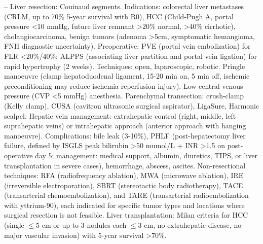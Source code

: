 -- Liver resection: Couinaud segments. Indications: colorectal liver metastases (CRLM, up to 70\% 5-year survival with R0), HCC (Child-Pugh A, portal pressure <10 mmHg, future liver remnant >20\% normal, >40\% cirrhotic), cholangiocarcinoma, benign tumors (adenoma >5cm, symptomatic hemangioma, FNH diagnostic uncertainty). Preoperative: PVE (portal vein embolization) for FLR <20\%/40\%; ALPPS (associating liver partition and portal vein ligation) for rapid hypertrophy (2 weeks). Techniques: open, laparoscopic, robotic. Pringle manoeuvre (clamp hepatoduodenal ligament, 15-20 min on, 5 min off, ischemic preconditioning may reduce ischemia-reperfusion injury). Low central venous pressure (CVP <5 mmHg) anesthesia. Parenchymal transection: crush-clamp (Kelly clamp), CUSA (cavitron ultrasonic surgical aspirator), LigaSure, Harmonic scalpel. Hepatic vein management: extrahepatic control (right, middle, left suprahepatic veins) or intrahepatic approach (anterior approach with hanging manoeuvre). Complications: bile leak (3-10\%), PHLF (post-hepatectomy liver failure, defined by ISGLS peak bilirubin >50 mumol/L + INR >1.5 on post-operative day 5; management: medical support, albumin, diuretics, TIPS, or liver transplantation in severe cases), hemorrhage, abscess, ascites. Non-resectional techniques: RFA (radiofrequency ablation), MWA (microwave ablation), IRE (irreversible electroporation), SBRT (stereotactic body radiotherapy), TACE (transarterial chemoembolization), and TARE (transarterial radioembolization with yttrium-90), each indicated for specific tumor types and locations where surgical resection is not feasible. Liver transplantation: Milan criteria for HCC (single \(\le\)5 cm or up to 3 nodules each \(\le\)3 cm, no extrahepatic disease, no major vascular invasion) with 5-year survival >70\%.

